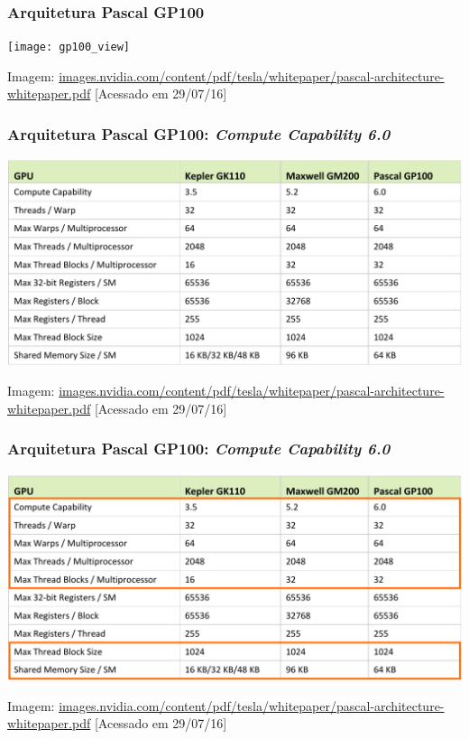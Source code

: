 \documentclass[10pt, compress]{beamer}
\begin{document}
\begin{frame}
    \frametitle{Arquitetura Pascal GP100}
    \centering
    \texttt{[image: gp100\_view]}
    \hfill

    \tiny{Imagem: \url{images.nvidia.com/content/pdf/tesla/whitepaper/pascal-architecture-whitepaper.pdf} [Acessado em 29/07/16]}
\end{frame}

\begin{frame}
    \frametitle{Arquitetura Pascal GP100: \textit{Compute Capability 6.0}}
    \centering
    \includegraphics[width=\textwidth]{cc_6}
    \hfill

    \tiny{Imagem: \url{images.nvidia.com/content/pdf/tesla/whitepaper/pascal-architecture-whitepaper.pdf} [Acessado em 29/07/16]}
\end{frame}

\begin{frame}
    \frametitle{Arquitetura Pascal GP100: \textit{Compute Capability 6.0}}
    \centering
    \includegraphics[width=\textwidth]{cc_6_highlight}
    \hfill

    \tiny{Imagem: \url{images.nvidia.com/content/pdf/tesla/whitepaper/pascal-architecture-whitepaper.pdf} [Acessado em 29/07/16]}
\end{frame}
\end{document}
